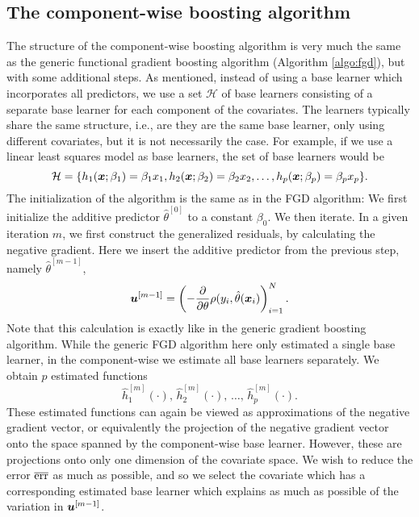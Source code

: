 \subsection{The component-wise boosting algorithm}
The structure of the component-wise boosting algorithm is very much the same as the generic functional gradient boosting algorithm (Algorithm \ref{algo:fgd}), but with some additional steps.
As mentioned, instead of using a base learner which incorporates all predictors, we use a set $\mathcal{H}$ of base learners consisting of a separate base learner for each component of the covariates.
The learners typically share the same structure, i.e., are they are the same base learner, only using different covariates, but it is not necessarily the case.
For example, if we use a linear least squares model as base learners, the set of base learners would be
\begin{equation*}
    \mathcal{H}=\{h_1(\bm{x};\beta_1)=\beta_1 x_1,h_2(\bm{x};\beta_2)=\beta_2 x_2,\ldots,h_p(\bm{x};\beta_p)=\beta_p x_p \}.
\end{equation*}
The initialization of the algorithm is the same as in the FGD algorithm:
We first initialize the additive predictor $\hat{\theta}^{[0]}$ to a constant $\beta_0$.
We then iterate.
In a given iteration $m$, we first construct the generalized residuals, by calculating the negative gradient.
Here we insert the additive predictor from the previous step, namely $\hat{\theta}^{[m-1]}$,
\begin{equation*}
    \bm{u}^{[m-1]}=\left(-\frac{\partial}{\partial \theta}\rho(y_i, \hat{\theta}(\bm{x}_i)\right)_{i=1}^N.
\end{equation*}
Note that this calculation is exactly like in the generic gradient boosting algorithm.
While the generic FGD algorithm here only estimated a single base learner, in the component-wise we estimate all base learners separately.
We obtain $p$ estimated functions
\begin{equation*}
    \hat{h}_1^{[m]}(\cdot),\,\hat{h}_2^{[m]}(\cdot),\,\ldots,\,\hat{h}_p^{[m]}(\cdot).
\end{equation*}
These estimated functions can again be viewed as approximations of the negative gradient vector, or equivalently the projection of the negative gradient vector onto the space spanned by the component-wise base learner.
However, these are projections onto only one dimension of the covariate space.
We wish to reduce the error $\overline{\text{err}}$ as much as possible, and so we select the covariate which has a corresponding estimated base learner which explains as much as possible of the variation in $\bm{u}^{[m-1]}$.
